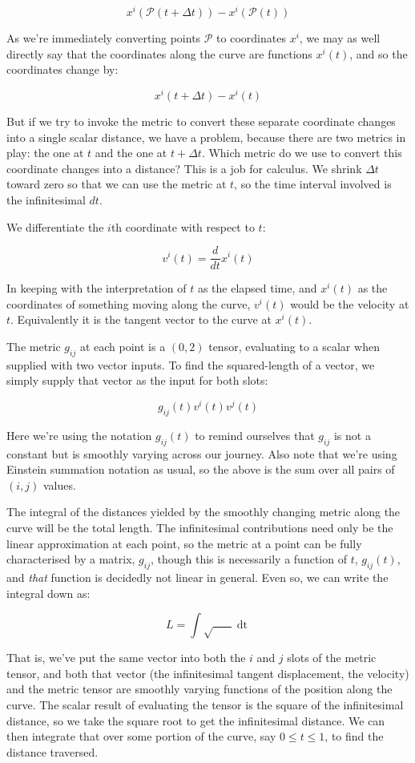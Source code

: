 $$
x^i(\mathcal{P}(t + \Delta t))
-
x^i(\mathcal{P}(t))
$$

As we're immediately converting points $\mathcal{P}$ to coordinates $x^i$, we may as well directly say that the coordinates along the curve are functions $x^i(t)$, and so the coordinates change by:

$$
x^i(t + \Delta t)
-
x^i(t)
$$

But if we try to invoke the metric to convert these separate coordinate changes into a single scalar distance, we have a problem, because there are two metrics in play: the one at $t$ and the one at $t + \Delta t$. Which metric do we use to convert this coordinate changes into a distance? This is a job for calculus. We shrink $\Delta t$ toward zero so that we can use the metric at $t$, so the time interval involved is the infinitesimal $dt$.

We differentiate the $i$th coordinate with respect to $t$:

$$
v^i(t) = \frac{d}{dt} x^i(t)
$$

In keeping with the interpretation of $t$ as the elapsed time, and $x^i(t)$ as the coordinates of something moving along the curve, $v^i(t)$ would be the velocity at $t$. Equivalently it is the tangent vector to the curve at $x^i(t)$.

The metric $g_{ij}$ at each point is a $(0, 2)$ tensor, evaluating to a scalar when supplied with two vector inputs. To find the squared-length of a vector, we simply supply that vector as the input for both slots:

$$
g_{ij}(t)
 v^i(t)  
 v^j(t) 
$$

Here we're using the notation $g_{ij}(t)$ to remind ourselves that $g_{ij}$ is not a constant but is smoothly varying across our journey. Also note that we're using Einstein summation notation as usual, so the above is the sum over all pairs of $(i, j)$ values.

The integral of the distances yielded by the smoothly changing metric along the curve will be the total length. The infinitesimal contributions need only be the linear approximation at each point, so the metric at a point can be fully characterised by a matrix, $g_{ij}$, though this is necessarily a function of $t$, $g_{ij}(t)$, and \textit{that} function is decidedly not linear in general. Even so, we can write the integral down as:

$$
L =
\int
\sqrt{
    \mathop{g_{ij}(t)}
    \mathop{v^i(t)}
    \mathop{v^j(t)}
}
\mathop{dt}
$$

That is, we've put the same vector into both the $i$ and $j$ slots of the metric tensor, and both that vector (the infinitesimal tangent displacement, the velocity) and the metric tensor are smoothly varying functions of the position along the curve. The scalar result of evaluating the tensor is the square of the infinitesimal distance, so we take the square root to get the infinitesimal distance. We can then integrate that over some portion of the curve, say $0 \le t \le 1$, to find the distance traversed.
